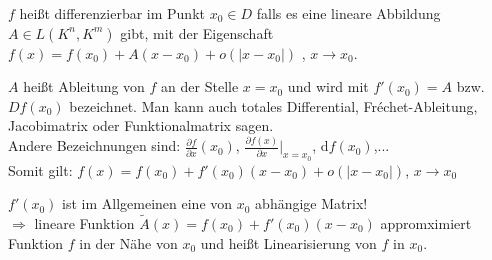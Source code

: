 	\begin{definition}
		$f$ heißt differenzierbar im Punkt $x_0\in D$ falls es eine lineare Abbildung $A\in L(K^n,K^m)$ gibt,
		mit der Eigenschaft $f(x)=f(x_0)+A(x-x_0)+o(|x-x_0|)$ , $x\to x_0$.
	\end{definition}

	\begin{definition}[Ableitung]
		$A$ heißt Ableitung von $f$ an der Stelle $x=x_0$ und wird mit $f'(x_0)=A$ bzw. $Df(x_0)$ 
		bezeichnet. Man kann auch totales Differential, Fréchet-Ableitung, Jacobimatrix oder 
		Funktionalmatrix sagen. \\
		Andere Bezeichnungen sind: $\frac{\partial f}{\partial x}(x_0)$, $\frac{\partial f(x)}{\partial x}\vert_
		{x=x_0}$, d$f(x_0)$,... \\
		Somit gilt: $f(x)=f(x_0)+f'(x_0)(x-x_0)+o(|x-x_0|)$, $x\to x_0$
	\end{definition}

	\begin{bemerkung}
		$f'(x_0)$ ist im Allgemeinen eine von $x_0$ abhängige Matrix! \\
		$\Rightarrow$ lineare Funktion $\tilde A(x)=f(x_0)+f'(x_0)(x-x_0)$ appromximiert Funktion $f$ 
		in der Nähe von $x_0$ und heißt Linearisierung von $f$ in $x_0$.
	\end{bemerkung}

